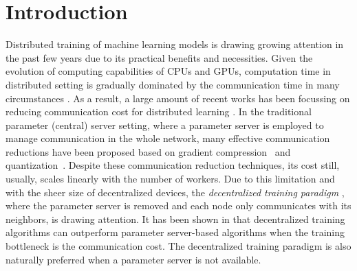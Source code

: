 \documentclass{article} %
\begin{document}
\vspace{-0.15in}
\section{Introduction}
\vspace{-0.05in}

Distributed training of machine learning models is drawing growing attention in the past few years due to its practical benefits and necessities. 
Given the evolution of computing capabilities of CPUs and GPUs, computation time in distributed setting is gradually dominated by the communication time in many circumstances \citep{chilimbi2014project, mcmahan2016communication}. 
As a result, a large amount of recent works has been focussing on reducing communication cost for distributed learning \citep{alistarh2017qsgd,lin2017deep,wangni2018gradient,stich2018sparsified,wang2018atomo,tang2019doublesqueeze}. 
In the traditional parameter (central) server setting, where a parameter server is employed to manage communication in the whole network, many effective communication reductions have been proposed based on gradient compression~\citep{aji2017sparse} and quantization~\citep{chen2010approximate, ge2013optimized,jegou2010product}. 
Despite these communication reduction techniques, its cost still, usually, scales linearly with the number of workers.  
Due to this limitation and with the sheer size of decentralized devices, the \emph{decentralized training paradigm} \citep{duchi2011dual}, where the parameter server is removed and each node only communicates with its neighbors, is drawing attention. 
It has been shown in \citet{lian2017can} that decentralized training algorithms can outperform parameter server-based algorithms when the training bottleneck is the communication cost. 
The decentralized training paradigm is also naturally preferred when a parameter server is not available. 
\end{document}
